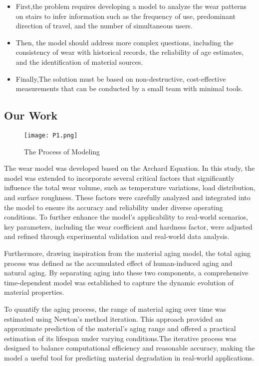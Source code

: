 \documentclass{mcmthesis}
\begin{document}
\begin{itemize}
\item First,the problem requires developing a model to analyze the wear patterns on stairs to infer information such as the frequency of use, predominant direction of travel, and the number of simultaneous users.

\item Then, the model should address more complex questions, including the consistency of wear with historical records, the reliability of age estimates, and the identification of material sources. 

\item Finally,The solution must be based on non-destructive, cost-effective measurements that can be conducted by a small team with minimal tools.


\end{itemize}

\subsection{Our Work}
\begin{figure}[htp]
    \centering
    \texttt{[image: P1.png]}
    \caption{The Process of Modeling}
\end{figure}
\hspace{1.5em}The wear model was developed based on the Archard Equation. In this study, the model was extended to incorporate several critical factors that significantly influence the total wear volume, such as temperature variations, load distribution, and surface roughness. These factors were carefully analyzed and integrated into the model to ensure its accuracy and reliability under diverse operating conditions. To further enhance the model's applicability to real-world scenarios, key parameters, including the wear coefficient and hardness factor, were adjusted and refined through experimental validation and real-world data analysis.

Furthermore, drawing inspiration from the material aging model, the total aging process was defined as the accumulated effect of human-induced aging and natural aging. By separating aging into these two components, a comprehensive time-dependent model was established to capture the dynamic evolution of material properties.

To quantify the aging process, the range of material aging over time was estimated using Newton's method iteration. This approach provided an approximate prediction of the material's aging range and offered a practical estimation of its lifespan under varying conditions.The iterative process was designed to balance computational efficiency and reasonable accuracy, making the model a useful tool for predicting material degradation in real-world applications.
\end{document}

